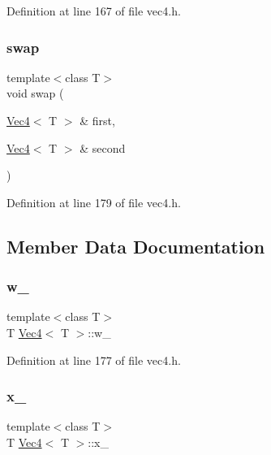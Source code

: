 Definition at line 167 of file vec4.\+h.

\mbox{\label{class_vec4_a5ecdc82e3fc8dff7b9d5926998a3ec39}} 
\subsubsection{\texorpdfstring{swap}{swap}}
{\footnotesize\ttfamily template$<$class T$>$ \\
void swap (\begin{DoxyParamCaption}\item[{\mbox{\hyperlink{class_vec4}{Vec4}}$<$ T $>$ \&}]{first,  }\item[{\mbox{\hyperlink{class_vec4}{Vec4}}$<$ T $>$ \&}]{second }\end{DoxyParamCaption})\hspace{0.3cm}{\ttfamily [friend]}}



Definition at line 179 of file vec4.\+h.



\subsection{Member Data Documentation}
\mbox{\label{class_vec4_a63ad1d4ce4bf1e9b082778a06b892d89}} 
\subsubsection{\texorpdfstring{w\_}{w\_}}
{\footnotesize\ttfamily template$<$class T$>$ \\
T \mbox{\hyperlink{class_vec4}{Vec4}}$<$ T $>$\+::w\+\_\+\hspace{0.3cm}{\ttfamily [private]}}



Definition at line 177 of file vec4.\+h.

\mbox{\label{class_vec4_af15cf636cd973c2d642173c411750f81}} 
\subsubsection{\texorpdfstring{x\_}{x\_}}
{\footnotesize\ttfamily template$<$class T$>$ \\
T \mbox{\hyperlink{class_vec4}{Vec4}}$<$ T $>$\+::x\+\_\+\hspace{0.3cm}{\ttfamily [private]}}



